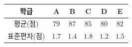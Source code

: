 {\renewcommand{\arraystretch}{1.35}\small
\begin{tabular}{|c|c|c|c|c|c|}
\hline
학급 & A & B & C & D & E \\ \hline
평균(점) & $79$ & $87$ & $85$ & $80$ & $82$ \\ \hline
표준편차(점) & $1.7$ & $1.4$ & $1.8$ & $1.2$ & $1.5$ \\ \hline
\end{tabular}}
